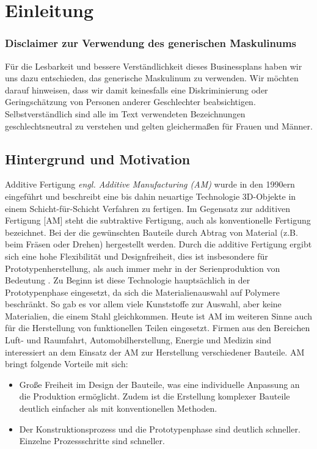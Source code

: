\chapter{Einleitung}
\label{einleitung}

\subsection*{Disclaimer zur Verwendung des generischen Maskulinums}
Für die Lesbarkeit und bessere Verständlichkeit dieses Businessplans haben wir uns dazu entschieden, das generische Maskulinum zu verwenden. Wir möchten darauf hinweisen, dass wir damit keinesfalls eine Diskriminierung oder Geringschätzung von Personen anderer Geschlechter beabsichtigen. Selbstverständlich sind alle im Text verwendeten Bezeichnungen geschlechtsneutral zu verstehen und gelten gleichermaßen für Frauen und Männer.

\pagebreak

\section{Hintergrund und Motivation}
Additive Fertigung \textit{engl. Additive Manufacturing (AM)} wurde in den 1990ern eingeführt und beschreibt eine bis dahin neuartige Technologie 3D-Objekte in einem Schicht-für-Schicht Verfahren zu fertigen. Im Gegensatz zur additiven Fertigung [AM] steht die subtraktive Fertigung, auch als konventionelle Fertigung bezeichnet. Bei der die gewünschten Bauteile durch Abtrag von Material (z.B. beim Fräsen oder Drehen) hergestellt werden. Durch die additive Fertigung ergibt sich eine hohe Flexibilität und Designfreiheit, dies ist insbesondere für Prototypenherstellung, als auch immer mehr in der Serienproduktion von Bedeutung \autocite{Prof.Dr.Ing.ChristianSeidel.2023}.
Zu Beginn ist diese Technologie hauptsächlich in der Prototypenphase eingesetzt, da sich die Materialienauswahl auf Polymere beschränkt. So gab es vor allem viele Kunststoffe zur Auswahl, aber keine Materialien, die einem Stahl gleichkommen.
Heute ist AM im weiteren Sinne auch für die Herstellung von funktionellen Teilen eingesetzt.  Firmen aus den Bereichen Luft- und Raumfahrt, Automobilherstellung, Energie und Medizin sind interessiert an dem Einsatz der AM zur Herstellung verschiedener Bauteile.
AM bringt folgende Vorteile mit sich:
\begin{itemize}
    \item Große Freiheit im Design der Bauteile, was eine individuelle Anpassung an die Produktion ermöglicht. Zudem ist die Erstellung komplexer Bauteile deutlich einfacher als mit konventionellen Methoden.
    \item Der Konstruktionsprozess und die Prototypenphase sind deutlich schneller. Einzelne Prozessschritte sind schneller.
\end{itemize}

